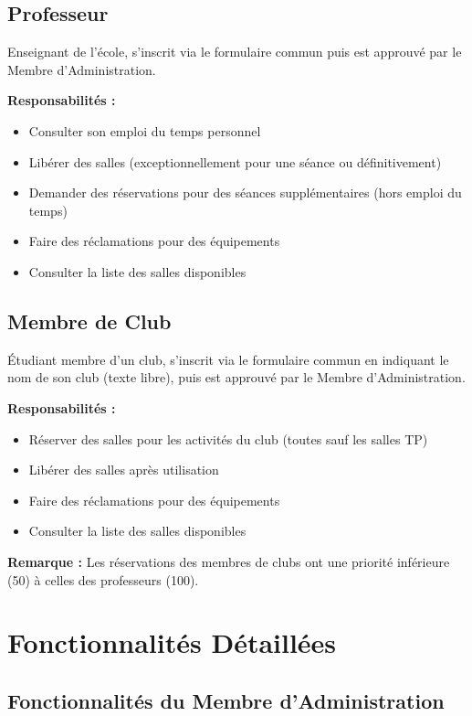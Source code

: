 \documentclass[12pt,a4paper]{article}
\begin{document}
\subsection{Professeur}
Enseignant de l'école, s'inscrit via le formulaire commun puis est approuvé par le Membre d'Administration.

\textbf{Responsabilités :}
\begin{itemize}
    \item Consulter son emploi du temps personnel
    \item Libérer des salles (exceptionnellement pour une séance ou définitivement)
    \item Demander des réservations pour des séances supplémentaires (hors emploi du temps)
    \item Faire des réclamations pour des équipements
    \item Consulter la liste des salles disponibles
\end{itemize}

\subsection{Membre de Club}
Étudiant membre d'un club, s'inscrit via le formulaire commun en indiquant le nom de son club (texte libre), puis est approuvé par le Membre d'Administration.

\textbf{Responsabilités :}
\begin{itemize}
    \item Réserver des salles pour les activités du club (toutes sauf les salles TP)
    \item Libérer des salles après utilisation
    \item Faire des réclamations pour des équipements
    \item Consulter la liste des salles disponibles
\end{itemize}

\textbf{Remarque :} Les réservations des membres de clubs ont une priorité inférieure (50) à celles des professeurs (100).

\section{Fonctionnalités Détaillées}

\subsection{Fonctionnalités du Membre d'Administration}
\end{document}

